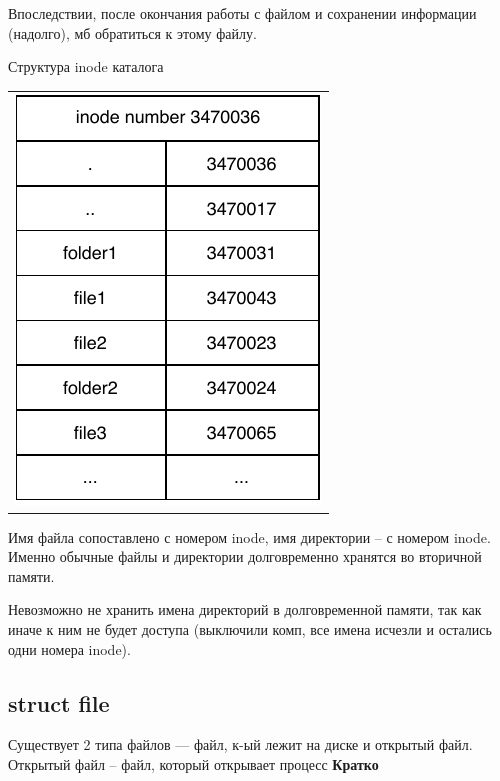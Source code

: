 Впоследствии, после окончания работы с файлом и сохранении информации (надолго), мб обратиться к этому файлу.

Структура inode каталога
\begin{table}[h!]
  \centering
  \begin{tabular}{p{1\linewidth}}
    \centering
    \includegraphics[width=0.8\linewidth]{./images/inode_catalog.pdf}
  \end{tabular}
\end{table}

Имя файла сопоставлено с номером inode, имя директории -- с номером inode. Именно обычные файлы и директории долговременно хранятся во вторичной памяти.

Невозможно не хранить имена директорий в долговременной памяти, так как иначе к ним не будет доступа (выключили комп, все имена исчезли и остались одни номера inode).

\subsection{struct file}

Существует 2 типа файлов --- файл, к-ый лежит на диске и открытый файл. Открытый файл -- файл, который открывает процесс
\textbf{Кратко}

